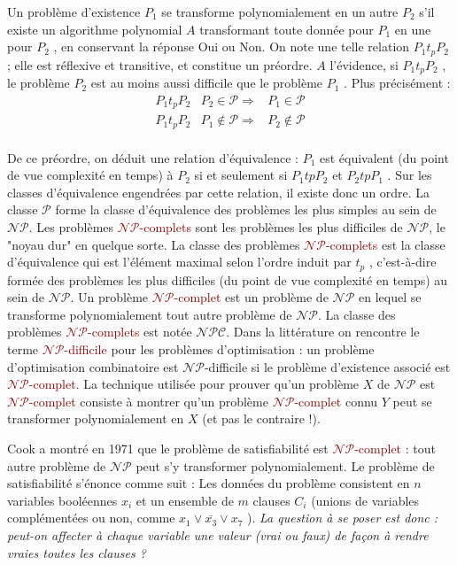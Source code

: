 \documentclass{article}
\newcommand{\red}[1]{\textcolor{darkred}{#1}}
\begin{document}
Un problème d’existence $P_1$ se transforme polynomialement en un autre $P_2$ s’il existe un algorithme polynomial $A$ transformant toute donnée pour $P_1$ en une pour 
$P_2$ , en conservant la réponse Oui ou Non. On note une telle relation $P_1 t_p P_2$ ; elle est réflexive et transitive, et constitue un préordre. $A$ l’évidence, si $P_1 t_p P_2$ 
, le problème $P_2$ est au moins aussi difficile que le problème $P_1$ . Plus précisément :
\[
\begin{array}{lll}
P_1 t_p P_2 & P_2 \in \mathcal{P} \Rightarrow & P_1 \in \mathcal{P} \\
P_1 t_p P_2 & P_1 \not\in \mathcal{P} \Rightarrow & P_2 \not\in \mathcal{P} \\
\end{array}
\]

De ce préordre, on déduit une relation d’équivalence : $P_1$ est équivalent (du point de vue complexité en temps) à $P_2$ si et seulement si $P_1 tp P_2$ et $P_2 tp P_1$ . Sur 
les classes d’équivalence engendrées par cette relation, il existe donc un ordre. La classe $\mathcal{P}$ forme la classe d’équivalence des problèmes les plus simples au sein de 
$\mathcal{N}\mathcal{P}$. Les problèmes \red{$\mathcal{N}\mathcal{P}$-complets} sont les problèmes les plus difficiles de $\mathcal{N}\mathcal{P}$, le "noyau dur" en 
quelque sorte. La classe des problèmes \red{$\mathcal{N}\mathcal{P}$-complets} est la classe d’équivalence qui est l’élément maximal selon l’ordre induit par $t_p$ , c’est-à-dire 
formée des problèmes les plus difficiles (du point de vue complexité en temps) au sein de $\mathcal{N}\mathcal{P}$. Un problème \red{$\mathcal{N}\mathcal{P}$-complet} est 
un problème de $\mathcal{N}\mathcal{P}$ en lequel se transforme polynomialement tout autre problème de $\mathcal{N}\mathcal{P}$. La classe des problèmes 
\red{$\mathcal{N}\mathcal{P}$-complets} est notée $\mathcal{N}\mathcal{P}\mathcal{C}$. Dans la littérature on rencontre le terme \red{$\mathcal{N}\mathcal{P}$-difficile} 
pour les problèmes d’optimisation : un problème d’optimisation combinatoire est $\mathcal{N}\mathcal{P}$-difficile si le problème d’existence associé est 
\red{$\mathcal{N}\mathcal{P}$-complet}. La technique utilisée pour prouver qu’un problème $X$ de $\mathcal{N}\mathcal{P}$ est \red{$\mathcal{N}\mathcal{P}$-complet} 
consiste à montrer qu’un problème \red{$\mathcal{N}\mathcal{P}$-complet} connu $Y$ peut se transformer polynomialement en $X$ (et pas le contraire !).

Cook a montré en 1971 que le problème de satisfiabilité est \red{$\mathcal{N}\mathcal{P}$-complet} : tout autre problème de $\mathcal{N}\mathcal{P}$ peut s’y transformer 
polynomialement. Le problème de satisfiabilité s’énonce comme suit : Les données du problème consistent en $n$ variables booléennes $x_i$ et un ensemble de $m$ clauses 
$C_i$ (unions de variables complémentées ou non, comme $x_1 \vee \bar{x_3} \vee x_7$ ). \textit{La question à se poser est donc : peut-on affecter à chaque variable une 
valeur (vrai ou faux) de façon à rendre vraies toutes les clauses ?}
\end{document}
